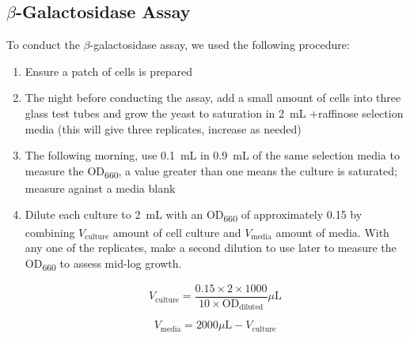 \subsection{\(\beta\)-Galactosidase Assay}

To conduct the \(\beta\)-galactosidase assay, we used the following procedure:

\begin{enumerate}
\item Ensure a patch of cells is prepared
\item The night before conducting the assay, add a small amount of cells into three glass test tubes and grow the yeast to saturation in \qty{2}{\milli\liter} +raffinose selection media (this will give three replicates, increase as needed)
\item The following morning, use \qty{0.1}{\milli\liter} in \qty{0.9}{\milli\liter} of the same selection media to measure the OD\textsubscript{\num{660}}, a value greater than one means the culture is saturated; measure against a media blank
\item Dilute each culture to \qty{2}{\milli\liter} with an OD\textsubscript{\num{660}} of approximately \num{0.15} by combining \(V_{\text{culture}}\) amount of cell culture and \(V_{\text{media}}\) amount of media. With any one of the replicates, make a second dilution to use later to measure the OD\textsubscript{\num{660}} to assess mid-log growth.

\[V_{\text{culture}} = \frac{0.15 \times 2 \times 1000}{10 \times \text{OD}_{\text{diluted}}}\mu\text{L}\]

\[V_{\text{media}} = 2000\mu\text{L} - V_{\text{culture}}\]


\end{enumerate}
